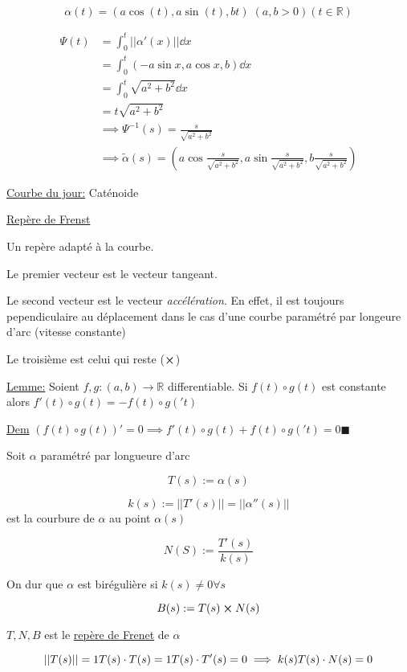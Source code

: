 \documentclass{article}
\begin{document}
$$\alpha(t)=(a\cos(t),a\sin(t),bt) \; (a, b >0) (t \in \mathbb{R})$$


\begin{align*}
	\Psi(t) &=\int_0^t || \alpha'(x)|| \dd x\\
			&= \int_0^t(-a\sin x, a\cos x, b) \dd x\\
			&=\int_0^t \sqrt{a^2 +b^2} \dd x\\
			&= t\sqrt{a^2+b^2}\\
			&\implies \Psi^{-1}(s) = \frac{s}{\sqrt{a^2+b^2}}\\
			&\implies \tilde{\alpha}(s) = (a\cos\frac{s}{\sqrt{a^2+b^2}}, a\sin\frac{s}{\sqrt{a^2+b^2}}, b\frac{s}{\sqrt{a^2+b^2}})
\end{align*}


\underline{Courbe du jour:} Caténoide

\underline{Repère de Frenst}

Un repère adapté à la courbe.

Le premier vecteur est le vecteur tangeant.

Le second vecteur est le vecteur \textit{accélération}. En effet, il est toujours pependiculaire au déplacement dans le cas d'une courbe paramétré par longeure d'arc (vitesse constante)

Le troisième est celui qui reste ($\cross$)

\underline{Lemme:} Soient $f,g:(a,b) \to \mathbb{R}$ differentiable. Si $f(t) \circ g(t)$ est constante alors $f'(t)\circ g(t) = -f(t)\circ g('t)$

\underline{Dem} 
$(f(t) \circ g(t))'=0 \implies f'(t)\circ g(t) +f(t)\circ g('t) = 0 \blacksquare$ 

Soit $\alpha$ paramétré par longueure d'arc

$$T(s) := \alpha(s)$$

$$k(s) := ||T'(s)|| = ||\alpha''(s)||$$ est la courbure de $\alpha$ au point $\alpha(s)$

$$N(S) :=\frac{T'(s)}{k(s)}$$

On dur que $\alpha$ est birégulière si $k(s) \neq 0 \forall s$ 

$$B(s) := T(s)\cross N(s)$$

$T,N,B$ est le \underline{repère de Frenet} de $\alpha$


\begin{equation*}
	||T(s)|| = 1\\
	T(s)\cdot T(s) = 1\\
	T(s)\cdot T'(s) = 0\\
	\implies k(s) T(s)\cdot N(s)  = 0
\end{equation*}
\end{document}
